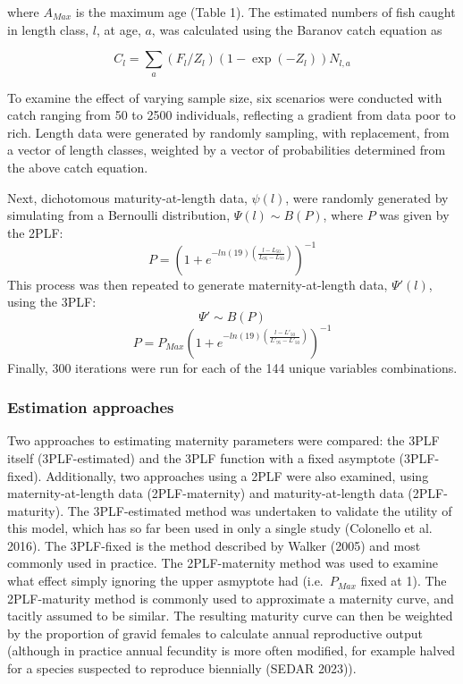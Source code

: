\documentclass[
]{article}
\begin{document}
where \(A_{Max}\) is the maximum age (Table 1). The estimated numbers of fish caught in length class, \(l\), at age, \(a\), was calculated using the Baranov catch equation as

\[
C_{l} = \sum_a(F_{l}/Z_{l})(1-\exp(-Z_{l}))N_{l,a}
\]

To examine the effect of varying sample size, six scenarios were conducted with catch ranging from 50 to 2500 individuals, reflecting a gradient from data poor to rich. Length data were generated by randomly sampling, with replacement, from a vector of length classes, weighted by a vector of probabilities determined from the above catch equation.

Next, dichotomous maturity-at-length data, \(\psi(l)\), were randomly generated by simulating from a Bernoulli distribution, \(\Psi(l) \sim B(P)\), where \(P\) was given by the 2PLF: \[P =  \left ( 1 + e^{-ln(19)\left ( \frac{l - L_{50}}{L_{95} - L_{50}} \right )}  \right )^{-1}\] This process was then repeated to generate maternity-at-length data, \(\Psi'(l)\), using the 3PLF: \[\Psi' \sim B(P)\] \[P =  P_{Max}\left ( 1 + e^{-ln(19)\left ( \frac{l - L'_{50}}{L'_{95} - L'_{50}} \right )}  \right )^{-1}\] Finally, 300 iterations were run for each of the 144 unique variables combinations.

\subsubsection{Estimation approaches}\label{estimation-approaches}

Two approaches to estimating maternity parameters were compared: the 3PLF itself (3PLF-estimated) and the 3PLF function with a fixed asymptote (3PLF-fixed). Additionally, two approaches using a 2PLF were also examined, using maternity-at-length data (2PLF-maternity) and maturity-at-length data (2PLF-maturity). The 3PLF-estimated method was undertaken to validate the utility of this model, which has so far been used in only a single study (Colonello et al. 2016). The 3PLF-fixed is the method described by Walker (2005) and most commonly used in practice. The 2PLF-maternity method was used to examine what effect simply ignoring the upper asmyptote had (i.e.~\(P_{Max}\) fixed at 1). The 2PLF-maturity method is commonly used to approximate a maternity curve, and tacitly assumed to be similar. The resulting maturity curve can then be weighted by the proportion of gravid females to calculate annual reproductive output (although in practice annual fecundity is more often modified, for example halved for a species suspected to reproduce biennially (SEDAR 2023)).
\end{document}
